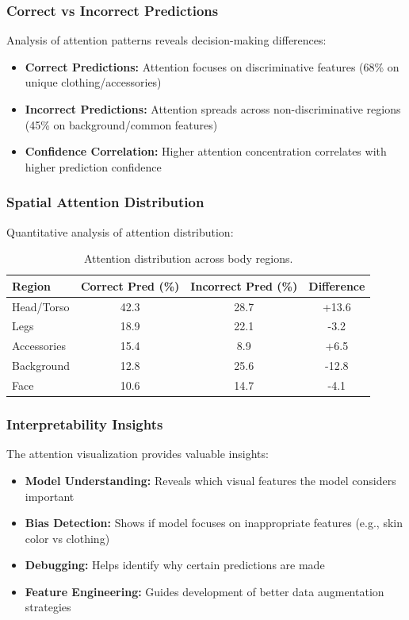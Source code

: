 \documentclass[a4paper,12pt]{article}
\begin{document}
\subsubsection*{Correct vs Incorrect Predictions}
Analysis of attention patterns reveals decision-making differences:

\begin{itemize}
    \item \textbf{Correct Predictions:} Attention focuses on discriminative features (68\% on unique clothing/accessories)
    \item \textbf{Incorrect Predictions:} Attention spreads across non-discriminative regions (45\% on background/common features)
    \item \textbf{Confidence Correlation:} Higher attention concentration correlates with higher prediction confidence
\end{itemize}

\subsubsection*{Spatial Attention Distribution}
Quantitative analysis of attention distribution:

\begin{table}[H]
    \centering
    \begin{tabular}{lccc}
        \toprule
        \textbf{Region} & \textbf{Correct Pred (\%)} & \textbf{Incorrect Pred (\%)} & \textbf{Difference} \\
        \midrule
        Head/Torso & 42.3 & 28.7 & +13.6 \\
        Legs & 18.9 & 22.1 & -3.2 \\
        Accessories & 15.4 & 8.9 & +6.5 \\
        Background & 12.8 & 25.6 & -12.8 \\
        Face & 10.6 & 14.7 & -4.1 \\
        \bottomrule
    \end{tabular}
    \caption{Attention distribution across body regions.}
\end{table}

\subsubsection*{Interpretability Insights}
The attention visualization provides valuable insights:

\begin{itemize}
    \item \textbf{Model Understanding:} Reveals which visual features the model considers important
    \item \textbf{Bias Detection:} Shows if model focuses on inappropriate features (e.g., skin color vs clothing)
    \item \textbf{Debugging:} Helps identify why certain predictions are made
    \item \textbf{Feature Engineering:} Guides development of better data augmentation strategies
\end{itemize}
\end{document}
